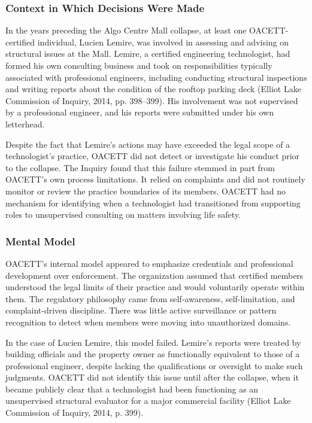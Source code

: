\documentclass[12pt]{article}
\begin{document}
\subsubsection*{Context in Which Decisions Were Made}
In the years preceding the Algo Centre Mall collapse, at least one OACETT-certified individual, Lucien Lemire, was involved in assessing and advising on structural issues at the Mall. Lemire, a certified engineering technologist, had formed his own consulting business and took on responsibilities typically associated with professional engineers, including conducting structural inspections and writing reports about the condition of the rooftop parking deck (Elliot Lake Commission of Inquiry, 2014, pp. 398–399). His involvement was not supervised by a professional engineer, and his reports were submitted under his own letterhead.

Despite the fact that Lemire’s actions may have exceeded the legal scope of a technologist's practice, OACETT did not detect or investigate his conduct prior to the collapse. The Inquiry found that this failure stemmed in part from OACETT’s own process limitations. It relied on complaints and did not routinely monitor or review the practice boundaries of its members. OACETT had no mechanism for identifying when a technologist had transitioned from supporting roles to unsupervised consulting on matters involving life safety.


\subsubsection*{Mental Model}
OACETT’s internal model appeared to emphasize credentials and professional development over enforcement. The organization assumed that certified members understood the legal limits of their practice and would voluntarily operate within them. The regulatory philosophy came from self-awareness, self-limitation, and complaint-driven discipline. There was little active surveillance or pattern recognition to detect when members were moving into unauthorized domains.

In the case of Lucien Lemire, this model failed. Lemire’s reports were treated by building officials and the property owner as functionally equivalent to those of a professional engineer, despite lacking the qualifications or oversight to make such judgments. OACETT did not identify this issue until after the collapse, when it became publicly clear that a technologist had been functioning as an unsupervised structural evaluator for a major commercial facility (Elliot Lake Commission of Inquiry, 2014, p. 399).
\end{document}

